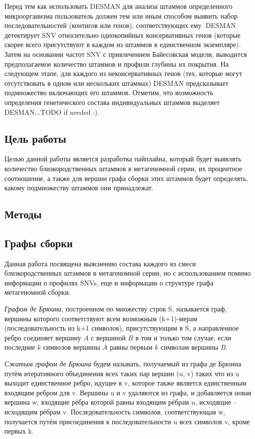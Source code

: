 \documentclass{spbau-diploma}
\begin{document}
 
Перед тем как использовать DESMAN для анализа штаммов определенного микроорганизма пользователь должен тем или иным способом выявить набор последовательностей (контигов или генов), соответствующих ему.
DESMAN детектирует SNV относительно однокопийных консервативных генов (которые скорее всего присутствуют в каждом из штаммов в единственном экземпляре). Затем на основании частот SNV с привлечением Байесовская модели, выводится предполагаемое количество штаммов и профили глубины их покрытия. 
На следующем этапе, для каждого из неконсервативных генов (тех, которые могут отсутствовать в одном или нескольких штаммах) DESMAN предсказывает подмножество включающих его штаммов.
Отметим, что возможность определения генетического состава индивидуальных штаммов выделяет DESMAN...TODO if needed :). 

\subsection{Цель работы}
Целью данной работы является разработка пайплайна, который будет выявлять количество близкородственных штаммов в метагеномной серии, их процентное соотношение, а также для вершин графа сборки этих штаммов будет определять, какому подмножеству штаммов они принадлежат.

\subsection{Методы}
\subsection{Графы сборки}
Данная работа посвящена выяснению состава каждого из смеси близкородственных штаммов в метагеномной серии, но с использованием помимо информации о профилях SNVs, еще и информации о структуре графа метагеномной сборки. 

\textit{Графом де Брюина}, построенном по множеству строк S, называется граф, вершины которого соответствуют всем возможным (k+1)-мерам (последовательность из k+1 символов), присутствующим в S, а направленное ребро соединяет вершину $A$ с вершиной $B$ в том и только том случае, если последние $k$ символов вершины $A$ равны первым $k$ символам вершины $B$.

\textit{Сжатым графом де Брюина} будем называть, получаемый из графа де Брюина путём итеративного объединения всех таких пар вершин (u, v) таких что из u выходит единственное ребро, идущее в v, которое также является единственным входящим ребром для v. Вершины u и v удаляются из графа, и добавляется новая вершина w, входящие рёбра которой равны входящим рёбрам u, исходящие -- исходящим рёбрам v. Последовательность символов, соответствующая w, получается путём присоединения к последовательности u всех символов v, кроме первых k.
\end{document}
